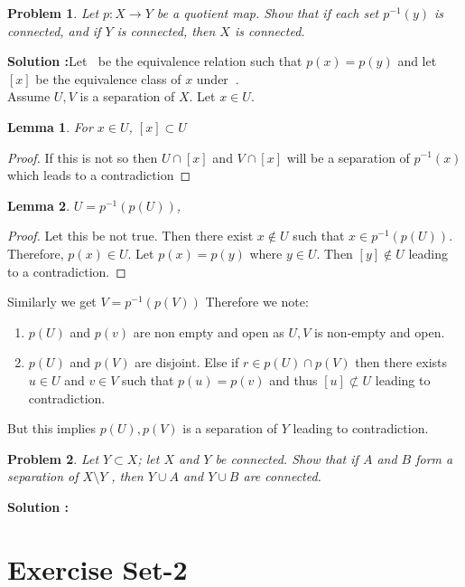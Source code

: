 \documentclass{article}
\newtheorem{problem}{Problem}
\numberwithin{problem}{section}
\newtheorem{lemma}{Lemma}
\begin{document}
\begin{tcolorbox}
\begin{problem}
  Let $p : X \to Y$ be a quotient map. Show that if each set $p^{-1}({y})$ is connected,
and if $Y$ is connected, then $X$ is connected.
\end{problem}
\end{tcolorbox}
\textbf{Solution :}Let $~$ be the equivalence relation such that $p(x)=p(y)$ and let $[x]$ be the equivalence class of $x$  under $~$.\\
Assume $U,V$ is a separation of $X$. Let $x\in U$.
\begin{lemma}
For $x\in U$, $[x]\subset U$
\end{lemma}
\begin{proof}
If this is not so then $U\cap [x]$ and $V\cap[x] $ will be a separation of $p^{-1}(x)$ which leads to a contradiction
\end{proof}
\begin{lemma}
$U=p^{-1}(p(U))$,
\end{lemma}
\begin{proof}
Let this be not true. Then there exist $x\notin U$ such that $x\in p^{-1}(p(U))$. Therefore, $p(x)\in U$. Let $p(x)=p(y)$ where $y\in U$. Then $[y]\notin U$ leading to a contradiction.
\end{proof}
Similarly we get $V=p^{-1}(p(V))$
Therefore we note:
\begin{enumerate}
    \item $p(U)$ and $p(v)$ are non empty and open as $U,V$ is non-empty and open.
    \item $p(U)$ and $p(V)$ are disjoint. Else if $r\in p(U)\cap p(V)$ then there exists $u\in U$ and $v\in V$ such that $p(u)=p(v)$ and thus $[u]\not\subset U$ leading to contradiction.
\end{enumerate}
But this implies $p(U),p(V)$ is a separation of $Y$ leading to contradiction.

\begin{tcolorbox}
\begin{problem}
  Let $Y \subset X$; let $X$ and $Y$ be connected. Show that if $A$ and $B$ form a separation
of $X \setminus Y$ , then $Y \cup A$ and $Y \cup B$ are connected.
\end{problem}
\end{tcolorbox}
\textbf{Solution :}

\section{Exercise Set-2}
\end{document}
